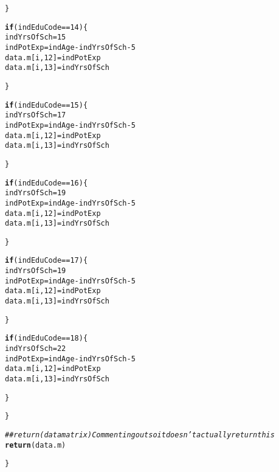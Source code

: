 \documentclass{article}\usepackage[]{graphicx}\usepackage[]{color}
\makeatletter
\newcommand{\hlnum}[1]{\textcolor[rgb]{0.686,0.059,0.569}{#1}}%
\newcommand{\hlcom}[1]{\textcolor[rgb]{0.678,0.584,0.686}{\textit{#1}}}%
\newcommand{\hlopt}[1]{\textcolor[rgb]{0,0,0}{#1}}%
\newcommand{\hlstd}[1]{\textcolor[rgb]{0.345,0.345,0.345}{#1}}%
\newcommand{\hlkwa}[1]{\textcolor[rgb]{0.161,0.373,0.58}{\textbf{#1}}}%
\newcommand{\hlkwb}[1]{\textcolor[rgb]{0.69,0.353,0.396}{#1}}%
\newcommand{\hlkwd}[1]{\textcolor[rgb]{0.737,0.353,0.396}{\textbf{#1}}}%
\newenvironment{kframe}{%
 \def\at@end@of@kframe{}%
 \ifinner\ifhmode%
  \def\at@end@of@kframe{\end{minipage}}%
  \begin{minipage}{\columnwidth}%
 \fi\fi%
 \def\FrameCommand##1{\hskip\@totalleftmargin \hskip-\fboxsep
 \colorbox{shadecolor}{##1}\hskip-\fboxsep
     \hskip-\linewidth \hskip-\@totalleftmargin \hskip\columnwidth}%
 \MakeFramed {\advance\hsize-\width
   \@totalleftmargin\z@ \linewidth\hsize
   \@setminipage}}%
 {\par\unskip\endMakeFramed%
 \at@end@of@kframe}
\newenvironment{knitrout}{}{} %
\makeatother
\begin{document}
\begin{knitrout}
\begin{kframe}
\begin{alltt}
    \hlstd{\}}

    \hlkwa{if} \hlstd{(indEduCode} \hlopt{==} \hlnum{14}\hlstd{)\{}
      \hlstd{indYrsOfSch} \hlkwb{=} \hlnum{15}
      \hlstd{indPotExp} \hlkwb{=} \hlstd{indAge} \hlopt{-} \hlstd{indYrsOfSch} \hlopt{-} \hlnum{5}
      \hlstd{data.m[i,}\hlnum{12}\hlstd{]} \hlkwb{=} \hlstd{indPotExp}
      \hlstd{data.m[i,}\hlnum{13}\hlstd{]} \hlkwb{=} \hlstd{indYrsOfSch}

    \hlstd{\}}

    \hlkwa{if} \hlstd{(indEduCode} \hlopt{==} \hlnum{15}\hlstd{)\{}
      \hlstd{indYrsOfSch} \hlkwb{=} \hlnum{17}
      \hlstd{indPotExp} \hlkwb{=} \hlstd{indAge} \hlopt{-} \hlstd{indYrsOfSch} \hlopt{-} \hlnum{5}
      \hlstd{data.m[i,}\hlnum{12}\hlstd{]} \hlkwb{=} \hlstd{indPotExp}
      \hlstd{data.m[i,}\hlnum{13}\hlstd{]} \hlkwb{=} \hlstd{indYrsOfSch}

    \hlstd{\}}

    \hlkwa{if} \hlstd{(indEduCode} \hlopt{==} \hlnum{16}\hlstd{)\{}
      \hlstd{indYrsOfSch} \hlkwb{=} \hlnum{19}
      \hlstd{indPotExp} \hlkwb{=} \hlstd{indAge} \hlopt{-} \hlstd{indYrsOfSch} \hlopt{-} \hlnum{5}
      \hlstd{data.m[i,}\hlnum{12}\hlstd{]} \hlkwb{=} \hlstd{indPotExp}
      \hlstd{data.m[i,}\hlnum{13}\hlstd{]} \hlkwb{=} \hlstd{indYrsOfSch}

    \hlstd{\}}

    \hlkwa{if} \hlstd{(indEduCode} \hlopt{==} \hlnum{17}\hlstd{)\{}
      \hlstd{indYrsOfSch} \hlkwb{=} \hlnum{19}
      \hlstd{indPotExp} \hlkwb{=} \hlstd{indAge} \hlopt{-} \hlstd{indYrsOfSch} \hlopt{-} \hlnum{5}
      \hlstd{data.m[i,}\hlnum{12}\hlstd{]} \hlkwb{=} \hlstd{indPotExp}
      \hlstd{data.m[i,}\hlnum{13}\hlstd{]} \hlkwb{=} \hlstd{indYrsOfSch}

    \hlstd{\}}

    \hlkwa{if} \hlstd{(indEduCode} \hlopt{==} \hlnum{18}\hlstd{)\{}
      \hlstd{indYrsOfSch} \hlkwb{=} \hlnum{22}
      \hlstd{indPotExp} \hlkwb{=} \hlstd{indAge} \hlopt{-} \hlstd{indYrsOfSch} \hlopt{-} \hlnum{5}
      \hlstd{data.m[i,}\hlnum{12}\hlstd{]} \hlkwb{=} \hlstd{indPotExp}
      \hlstd{data.m[i,}\hlnum{13}\hlstd{]} \hlkwb{=} \hlstd{indYrsOfSch}

    \hlstd{\}}

  \hlstd{\}}

  \hlcom{## return(datamatrix) Commenting out so it doesn't actually return this}
  \hlkwd{return}\hlstd{(data.m)}

\hlstd{\}}


\end{alltt}
\end{kframe}
\end{knitrout}
\end{document}
